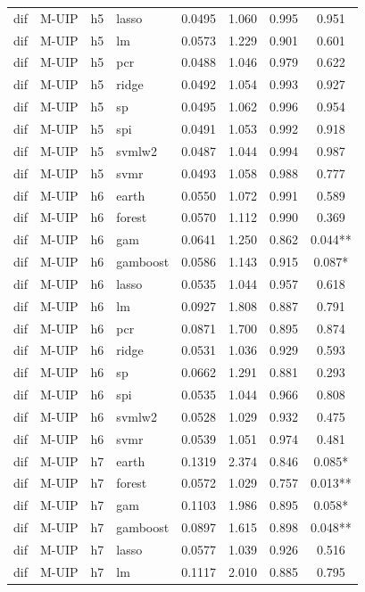 \begin{ThreePartTable}
\begin{longtable}[t]{llclcccc}
dif & M-UIP & h5 & lasso & 0.0495 & 1.060 & 0.995 & 0.951\\
dif & M-UIP & h5 & lm & 0.0573 & 1.229 & 0.901 & 0.601\\
dif & M-UIP & h5 & pcr & 0.0488 & 1.046 & 0.979 & 0.622\\
dif & M-UIP & h5 & ridge & 0.0492 & 1.054 & 0.993 & 0.927\\
dif & M-UIP & h5 & sp & 0.0495 & 1.062 & 0.996 & 0.954\\
dif & M-UIP & h5 & spi & 0.0491 & 1.053 & 0.992 & 0.918\\
dif & M-UIP & h5 & svmlw2 & 0.0487 & 1.044 & 0.994 & 0.987\\
dif & M-UIP & h5 & svmr & 0.0493 & 1.058 & 0.988 & 0.777\\
\addlinespace
dif & M-UIP & h6 & earth & 0.0550 & 1.072 & 0.991 & 0.589\\
dif & M-UIP & h6 & forest & 0.0570 & 1.112 & 0.990 & 0.369\\
dif & M-UIP & h6 & gam & 0.0641 & 1.250 & 0.862 & 0.044**\\
dif & M-UIP & h6 & gamboost & 0.0586 & 1.143 & 0.915 & 0.087*\\
dif & M-UIP & h6 & lasso & 0.0535 & 1.044 & 0.957 & 0.618\\
dif & M-UIP & h6 & lm & 0.0927 & 1.808 & 0.887 & 0.791\\
dif & M-UIP & h6 & pcr & 0.0871 & 1.700 & 0.895 & 0.874\\
dif & M-UIP & h6 & ridge & 0.0531 & 1.036 & 0.929 & 0.593\\
dif & M-UIP & h6 & sp & 0.0662 & 1.291 & 0.881 & 0.293\\
dif & M-UIP & h6 & spi & 0.0535 & 1.044 & 0.966 & 0.808\\
dif & M-UIP & h6 & svmlw2 & 0.0528 & 1.029 & 0.932 & 0.475\\
dif & M-UIP & h6 & svmr & 0.0539 & 1.051 & 0.974 & 0.481\\
\addlinespace
dif & M-UIP & h7 & earth & 0.1319 & 2.374 & 0.846 & 0.085*\\
dif & M-UIP & h7 & forest & 0.0572 & 1.029 & 0.757 & 0.013**\\
dif & M-UIP & h7 & gam & 0.1103 & 1.986 & 0.895 & 0.058*\\
dif & M-UIP & h7 & gamboost & 0.0897 & 1.615 & 0.898 & 0.048**\\
dif & M-UIP & h7 & lasso & 0.0577 & 1.039 & 0.926 & 0.516\\
dif & M-UIP & h7 & lm & 0.1117 & 2.010 & 0.885 & 0.795\\

\end{longtable}
\end{ThreePartTable}
